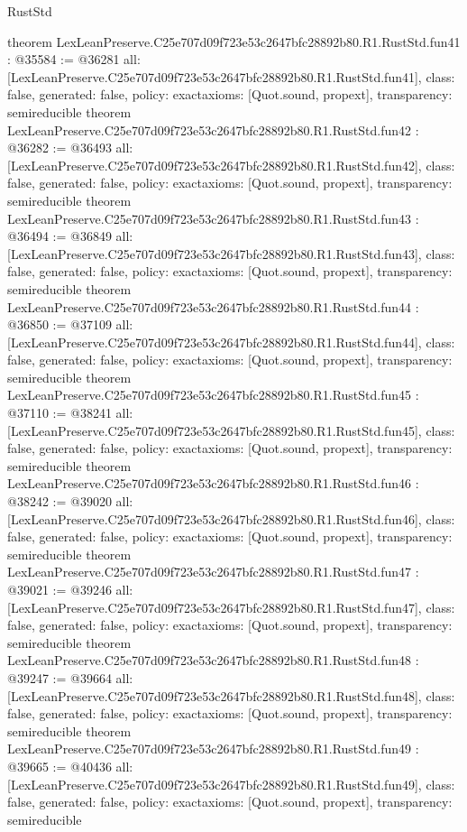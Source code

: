 \begin{lexlean}{RustStd}
\begin{coremodule}
{}
theorem LexLeanPreserve.C25e707d09f723e53c2647bfc28892b80.R1.RustStd.fun41 : @35584 := @36281 {
  all: [LexLeanPreserve.C25e707d09f723e53c2647bfc28892b80.R1.RustStd.fun41],
  class: false,
  generated: false,
  policy: exact{axioms: [Quot.sound, propext]},
  transparency: semireducible
}
theorem LexLeanPreserve.C25e707d09f723e53c2647bfc28892b80.R1.RustStd.fun42 : @36282 := @36493 {
  all: [LexLeanPreserve.C25e707d09f723e53c2647bfc28892b80.R1.RustStd.fun42],
  class: false,
  generated: false,
  policy: exact{axioms: [Quot.sound, propext]},
  transparency: semireducible
}
theorem LexLeanPreserve.C25e707d09f723e53c2647bfc28892b80.R1.RustStd.fun43 : @36494 := @36849 {
  all: [LexLeanPreserve.C25e707d09f723e53c2647bfc28892b80.R1.RustStd.fun43],
  class: false,
  generated: false,
  policy: exact{axioms: [Quot.sound, propext]},
  transparency: semireducible
}
theorem LexLeanPreserve.C25e707d09f723e53c2647bfc28892b80.R1.RustStd.fun44 : @36850 := @37109 {
  all: [LexLeanPreserve.C25e707d09f723e53c2647bfc28892b80.R1.RustStd.fun44],
  class: false,
  generated: false,
  policy: exact{axioms: [Quot.sound, propext]},
  transparency: semireducible
}
theorem LexLeanPreserve.C25e707d09f723e53c2647bfc28892b80.R1.RustStd.fun45 : @37110 := @38241 {
  all: [LexLeanPreserve.C25e707d09f723e53c2647bfc28892b80.R1.RustStd.fun45],
  class: false,
  generated: false,
  policy: exact{axioms: [Quot.sound, propext]},
  transparency: semireducible
}
theorem LexLeanPreserve.C25e707d09f723e53c2647bfc28892b80.R1.RustStd.fun46 : @38242 := @39020 {
  all: [LexLeanPreserve.C25e707d09f723e53c2647bfc28892b80.R1.RustStd.fun46],
  class: false,
  generated: false,
  policy: exact{axioms: [Quot.sound, propext]},
  transparency: semireducible
}
theorem LexLeanPreserve.C25e707d09f723e53c2647bfc28892b80.R1.RustStd.fun47 : @39021 := @39246 {
  all: [LexLeanPreserve.C25e707d09f723e53c2647bfc28892b80.R1.RustStd.fun47],
  class: false,
  generated: false,
  policy: exact{axioms: [Quot.sound, propext]},
  transparency: semireducible
}
theorem LexLeanPreserve.C25e707d09f723e53c2647bfc28892b80.R1.RustStd.fun48 : @39247 := @39664 {
  all: [LexLeanPreserve.C25e707d09f723e53c2647bfc28892b80.R1.RustStd.fun48],
  class: false,
  generated: false,
  policy: exact{axioms: [Quot.sound, propext]},
  transparency: semireducible
}
theorem LexLeanPreserve.C25e707d09f723e53c2647bfc28892b80.R1.RustStd.fun49 : @39665 := @40436 {
  all: [LexLeanPreserve.C25e707d09f723e53c2647bfc28892b80.R1.RustStd.fun49],
  class: false,
  generated: false,
  policy: exact{axioms: [Quot.sound, propext]},
  transparency: semireducible
}
\end{coremodule}
\end{lexlean}
